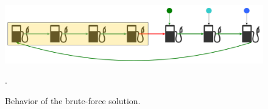 \begin{figure}
	\centering
	\includegraphics[width=\textwidth]{sources/gas_station/images/example_expl2}
	\caption[]{Behavior of the brute-force solution.}.
	\label{fig:gas_station:fig:gas_station:example_expl2}
\end{figure}





